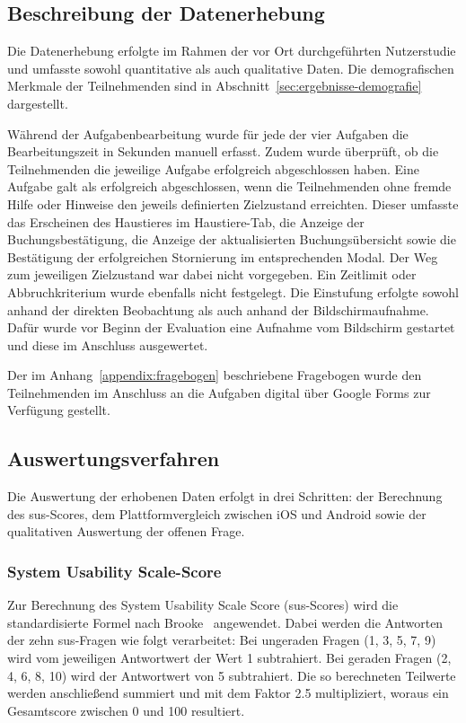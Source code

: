 \subsection{Beschreibung der Datenerhebung}
\label{sec:datenerhebung}

Die Datenerhebung erfolgte im Rahmen der vor Ort durchgeführten Nutzerstudie und umfasste sowohl quantitative als auch qualitative Daten. Die demografischen Merkmale der Teilnehmenden sind in Abschnitt~\ref{sec:ergebnisse-demografie} dargestellt.

Während der Aufgabenbearbeitung wurde für jede der vier Aufgaben die Bearbeitungszeit in Sekunden manuell erfasst. Zudem wurde überprüft, ob die Teilnehmenden die jeweilige Aufgabe erfolgreich abgeschlossen haben. Eine Aufgabe galt als erfolgreich abgeschlossen, wenn die Teilnehmenden ohne fremde Hilfe oder Hinweise den jeweils definierten Zielzustand erreichten. Dieser umfasste das Erscheinen des Haustieres im Haustiere-Tab, die Anzeige der Buchungsbestätigung, die Anzeige der aktualisierten Buchungsübersicht sowie die Bestätigung der erfolgreichen Stornierung im entsprechenden Modal. Der Weg zum jeweiligen Zielzustand war dabei nicht vorgegeben. Ein Zeitlimit oder
Abbruchkriterium wurde ebenfalls nicht festgelegt. Die Einstufung
erfolgte sowohl anhand der direkten Beobachtung als auch anhand der Bildschirmaufnahme. Dafür wurde vor Beginn der Evaluation eine
Aufnahme vom Bildschirm gestartet und diese im Anschluss ausgewertet.

Der im Anhang~\ref{appendix:fragebogen} beschriebene Fragebogen wurde den Teilnehmenden im Anschluss an die Aufgaben digital über Google Forms zur Verfügung gestellt.

\subsection{Auswertungsverfahren}

Die Auswertung der erhobenen Daten erfolgt in drei Schritten: der Berechnung des \gls{sus}-Scores, dem Plattformvergleich zwischen iOS und Android sowie der qualitativen Auswertung der offenen 
Frage.

\subsubsection{System Usability Scale-Score}

Zur Berechnung des System Usability Scale Score (\gls{sus}-Scores) wird die standardisierte Formel nach Brooke~\cite{brooke} angewendet. Dabei werden die Antworten der zehn \gls{sus}-Fragen wie folgt verarbeitet: Bei ungeraden Fragen (1, 3, 5, 7, 9) wird vom jeweiligen Antwortwert 
der Wert 1 subtrahiert. Bei geraden Fragen (2, 4, 6, 8, 10) wird der Antwortwert von 5 subtrahiert. Die so berechneten Teilwerte werden anschließend summiert und mit dem Faktor 2.5 multipliziert, woraus ein Gesamtscore zwischen 0 und 100 resultiert.

